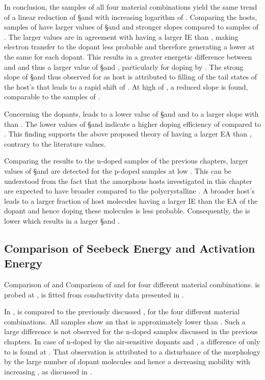 In conclusion, the samples of all four material combinations yield the same trend of a linear reduction of \S and \Es with increasing logarithm of \C.
Comparing the hosts, samples of \lili have larger values of \S and \Es and stronger slopes compared to samples of \meo. The larger values are in agreement with \lili having a larger IE than \meo, making electron transfer to the dopant less probable and therefore generating a lower \nhLong at the same \CLong for each dopant. This results in a greater energetic difference between \EfLong and \EtLong and thus a larger value of \S and \Es, particularly for doping by \CSF.
The strong slope of \S and thus \Es observed for \lili as host is attributed to filling of the tail states of the host's \dosLong that leads to a rapid shift of \Ef. At high \CLongs of \FS, a reduced slope is found, comparable to the samples of \meo.

Concerning the dopants, \FS leads to a lower value of \S and \Es and to a larger slope with \C than \CSF. The lower values of \S and \Es indicate a higher doping efficiency of \FS compared to \CSF. This finding supports the above proposed theory of \FS having a larger EA than \CSF, contrary to the literature values.

Comparing the results to the n-doped \CS samples of the previous chapters, larger values of \S and \Es are detected for the p-doped samples at low \CLongs.
This can be understood from the fact that the amorphous hosts investigated in this chapter are expected to have broader \dosLongs compared to the polycrystalline \CS. A broader host's \dos leads to a larger fraction of host molecules having a larger IE than the EA of the dopant and hence doping these molecules is less probable. Consequently, the \nhLong is lower which results in a larger \S and \Es.

\subsection{Comparison of Seebeck Energy and Activation Energy}
\label{sec:ResP-EsEact}

%
{Comparison of \Es and \Eact}
{Comparison of \EsLongL and \EactLongL for four different material combinations. \Es is probed at \Tm[40], \Eact is fitted from conductivity data presented in .}

In , \Es is compared to the previously discussed \EactLong \Eact, for the four different material combinations. All samples show an \Es that is approximately  lower than \Eact. Such a large difference is not observed for the n-doped samples discussed in the previous chapters. In case of \CS n-doped by the air-sensitive dopants \CrPd and \WPd, a difference of only  to  is found at . That observation is attributed to a disturbance of the morphology by the large number of dopant molecules and hence a decreasing mobility with increasing \C, as discussed in .

